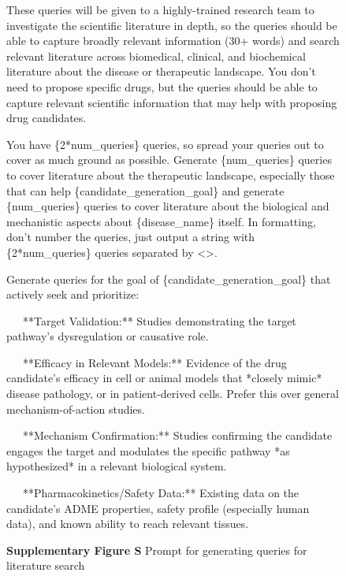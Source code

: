 \documentclass{article}
\newcounter{suppfigure}
\renewcommand{\thesuppfigure}{S\arabic{suppfigure}}
\newenvironment{suppfigureenv}{
  \renewcommand{\thefigure}{S\arabic{suppfigure}}%
  \refstepcounter{suppfigure}%
  \begin{figure}[H]
}{
  \end{figure}
}
\begin{document}
\begin{suppfigureenv}
\begin{tcolorbox}
\quad These queries will be given to a highly-trained research team to investigate the scientific literature in depth, so the queries should be able to capture broadly relevant information (30+ words) and search relevant literature across biomedical, clinical, and biochemical literature about the disease or therapeutic landscape. You don't need to propose specific drugs, but the queries should be able to capture relevant scientific information that may help with proposing drug candidates.

\quad You have \{2*num\_queries\} queries, so spread your queries out to cover as much ground as possible. Generate \{num\_queries\} queries to cover literature about the therapeutic landscape, especially those that can help \{candidate\_generation\_goal\} and generate \{num\_queries\} queries to cover literature about the biological and mechanistic aspects about \{disease\_name\} itself. In formatting, don't number the queries, just output a string with \{2*num\_queries\} queries separated by \textless{}\textgreater{}.

\quad Generate queries for the goal of \{candidate\_generation\_goal\} that actively seek and prioritize:

\quad *\ \ \ **Target Validation:** Studies demonstrating the target pathway's dysregulation or causative role.

\quad *\ \ \ **Efficacy in Relevant Models:** Evidence of the drug candidate's efficacy in cell or animal models that *closely mimic* disease pathology, or in patient-derived cells. Prefer this over general mechanism-of-action studies.

\quad *\ \ \ **Mechanism Confirmation:** Studies confirming the candidate engages the target and modulates the specific pathway *as hypothesized* in a relevant biological system.

\quad *\ \ \ **Pharmacokinetics/Safety Data:** Existing data on the candidate's ADME properties, safety profile (especially human data), and known ability to reach relevant tissues.

\end{tcolorbox}

\textbf{Supplementary Figure \thesuppfigure}{ Prompt for generating queries for literature search}
\label{fig:prompt_cand_gen_lit_search}
\end{suppfigureenv}

\newpage
\end{document}
